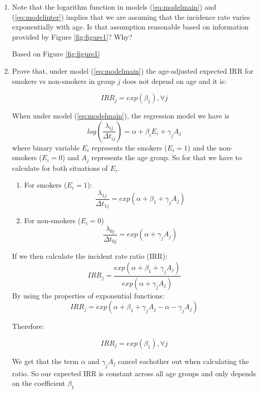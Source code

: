 \documentclass[10pt,a4paper,twoside]{article}\usepackage[]{graphicx}\usepackage[]{xcolor}
\begin{document}
\begin{enumerate}
    \item  Note that the logarithm function in models (\ref{eq:modelmain}) and (\ref{eq:modelinter}) implies that we are assuming that the incidence rate varies exponentially with age. Is that assumption reasonable based on information provided by Figure \ref{fig:figure1}? Why?

    Based on Figure \ref{fig:figure1} 

    \item Prove that, under model (\ref{eq:modelmain}) the age-adjusted expected IRR for smokers vs non-smokers in group $j$ does not depend on age and it is:

    \[
    IRR_{j} = exp(\beta_{1}), \forall j
    \]
    
    When under model (\ref{eq:modelmain}), the regression model we have is
    \[
    log \left(\frac{\lambda_{ij}}{\Delta t_{ij}} \right) = \alpha + \beta_{i} E_{i} + \gamma_{j} A_{j}
    \]
    where binary variable $E_{i}$ represents the smokers ($E_{i} = 1$) and the non-smokers ($E_{i}=0$) and $A_{j}$ represents the age group. So for that we have to calculate for both situations of $E_{i}$.
    \begin{enumerate}
        \item For smokers ($E_{i} = 1$):
    \[
        \frac{\lambda_{1j}}{\Delta t_{1j}} = exp \left( \alpha + \beta_{1} + \gamma_{j} A_{j} \right)
    \]
        \item For non-smokers ($E_{i} = 0$)
        \[
        \frac{\lambda_{0j}}{\Delta t_{0j}} = exp \left( \alpha + \gamma_{j} A_{j} \right)
    \]
    \end{enumerate}
If we then calculate the incident rate ratio (IRR):
\[
        IRR_{j} = \frac{exp \left( \alpha + \beta_{1} + \gamma_{j} A_{j} \right) }{exp \left(\alpha + \gamma_{j} A_{j} \right)}
    \]
By using the properties of exponential functions:
\[
    IRR_{j} = exp \left(\alpha + \beta_{1} + \gamma_{j} A_{j} - \alpha - \gamma_{j} A_{j}\right)
\]

Therefore:

\[
    IRR_{j} = exp \left(\beta_{1}\right), \forall j
\]

We get that the term $\alpha$ and $\gamma_{j} A_{j}$ cancel eachother out when calculating the ratio. So our expected IRR is constant across all age groups and only depends on the coefficient $\beta_{1}$
\end{enumerate}

\end{document}
